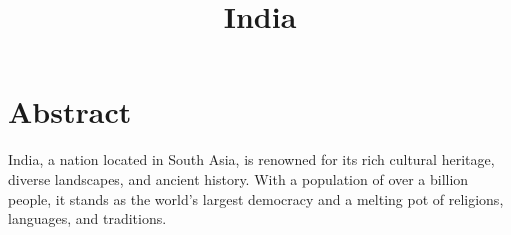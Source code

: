 \documentclass{article}
\title{India}
\author{}
\date{}
\begin{document}
\maketitle{}
\section*{Abstract}

India, a nation located in South Asia, is renowned for its rich cultural heritage, diverse landscapes, and ancient history. With a population of over a billion people, it stands as the world's largest democracy and a melting pot of religions, languages, and traditions. 
\end{document}
